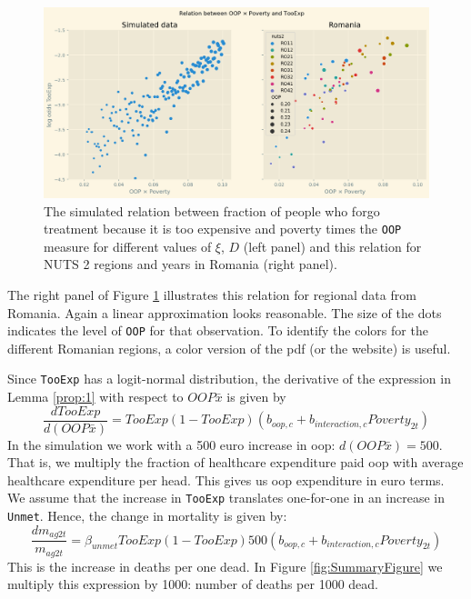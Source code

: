 \documentclass[a4paper,12pt]{article}
\begin{document}
\begin{figure}[htbp]
\centering
\includegraphics[width=.9\linewidth]{./figures/Parametric3.png}
\caption{\label{fig:Parametric}The simulated relation between fraction of people who forgo treatment because it is too expensive and poverty times the \texttt{OOP} measure for different values of \(\xi\), \(D\) (left panel) and this relation for NUTS 2 regions and years in Romania (right panel).}
\end{figure}

The right panel of Figure \ref{fig:Parametric} illustrates this relation for regional data from Romania. Again a linear approximation looks reasonable. The size of the dots indicates the level of \texttt{OOP} for that observation. To identify the colors for the different Romanian regions, a color version of the pdf (or the website) is useful.

Since \texttt{TooExp} has a logit-normal distribution, the derivative of the expression in Lemma \ref{prop:1} with respect to \(OOP \bar{x}\) is given by
\begin{equation}
\frac{dTooExp}{d(OOP \bar{x})} = TooExp(1-TooExp) (b_{oop,c} + b_{interaction,c} Poverty_{2t})
\end{equation}
In the simulation we work with a 500 euro increase in oop: \(d(OOP \bar{x})=500\). That is, we multiply the fraction of healthcare expenditure paid oop with average healthcare expenditure per head. This gives us oop expenditure in euro terms. We assume that the increase in \texttt{TooExp} translates one-for-one in an increase in \texttt{Unmet}. Hence, the change in mortality is given by:
\begin{equation}
\label{eq:effect_per_1000}
\frac{dm_{ag2t}}{m_{ag2t}} = \beta_{unmet} TooExp(1-TooExp) 500 (b_{oop,c} + b_{interaction,c} Poverty_{2t})
\end{equation}
This is the increase in deaths per one dead. In Figure \ref{fig:SummaryFigure} we multiply this expression by 1000: number of deaths per 1000 dead.
\end{document}
